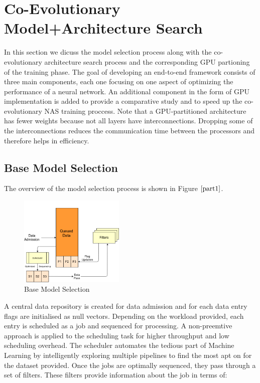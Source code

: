 \documentclass[conference]{IEEEtran}
\begin{document}
\section{Co-Evolutionary Model+Architecture Search}

In this section we dicuss the model selection process along with the co-evolutionary architecture search process and the corresponding GPU partioning of the training phase. The goal of developing an end-to-end framework consists of three main components, each one focusing on one aspect of optimizing the performance of a neural network. An additional component in the form of GPU implementation is added to provide a comparative study and to speed up the co-evolutionary NAS training proccess. Note that a GPU-partitioned architecture has fewer weights because not all layers have interconnections. Dropping some of the interconnections reduces the communication time between the processors and therefore helps in efficiency.

\subsection{Base Model Selection}
The overview of the model selection process is shown in Figure $\ref{part1}$.
\begin{figure}[!b]
\centerline{\includegraphics[width=50mm]{part1.png}}
\caption{Base Model Selection}
\label{part1}
\end{figure}

A central data repository is created for data admission and for each data entry flags are initialised as null vectors. Depending on the workload provided, each entry is scheduled as a job and sequenced for processing. A non-preemtive approach is applied to the scheduling task for higher throughput and low scheduling overhead. The scheduler automates the tedious part of Machine Learning by intelligently exploring multiple pipelines to find the most apt on for the dataset provided. Once the jobs are optimally sequenced, they pass through a set of filters. These filters provide information about the job in terms of:
\end{document}

